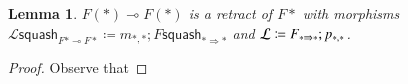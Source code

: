 \documentclass{article}
\newtheorem{lemma}[theorem]{Lemma}
\let\split\relax
\newcommand{\cat}[1]{\mathcal{#1}}
\newcommand{\id}[0]{\mathsf{id}}
\newcommand{\lolli}{\multimap}
\newcommand{\split}[0]{\mathsf{split}}
\newcommand{\squash}[0]{\mathsf{squash}}
\begin{document}
\begin{lemma}
  $F(\ast) \lolli F(\ast)$ is a retract of $F\ast$ with morphisms $\cat{L}\squash_{F\ast \lolli F\ast} \coloneqq m_{\ast,\ast} ; F \squash_{\ast \Rightarrow \ast}$ and $\cat{L}\split \coloneqq  F \split_{\ast \Rightarrow \ast} ; p_{\ast,\ast} $.
\end{lemma}
\begin{proof}
  Observe that

\end{proof}
\vspace{-15px}
 
\end{document}
